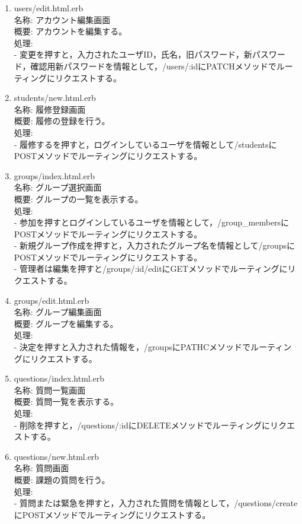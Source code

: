 \begin{enumerate}
\item users/edit.html.erb\\
名称:
アカウント編集画面\\
概要:
アカウントを編集する。\\
処理:\\
- 変更を押すと，入力されたユーザID，氏名，旧パスワード，新パスワード，確認用新パスワードを情報として，/users/:idにPATCHメソッドでルーティングにリクエストする。

\item students/new.html.erb\\
名称:
履修登録画面\\
概要:
履修の登録を行う。\\
処理:\\
- 履修するを押すと，ログインしているユーザを情報として/studentsにPOSTメソッドでルーティングにリクエストする。

\item groups/index.html.erb\\
名称:
グループ選択画面\\
概要:
グループの一覧を表示する。\\
処理:\\
- 参加を押すとログインしているユーザを情報として，/group\_membersにPOSTメソッドでルーティングにリクエストする。\\
- 新規グループ作成を押すと，入力されたグループ名を情報として/groupsにPOSTメソッドでルーティングにリクエストする。\\
- 管理者は編集を押すと/groups/:id/editにGETメソッドでルーティングにリクエストする。

\item groups/edit.html.erb\\
名称:
グループ編集画面\\
概要:
グループを編集する。\\
処理:\\
- 決定を押すと入力された情報を，/groupsにPATHCメソッドでルーティングにリクエストする。

\item questions/index.html.erb\\
名称:
質問一覧画面\\
概要:
質問一覧を表示する。\\
処理:\\
- 削除を押すと，/questions/:idにDELETEメソッドでルーティングにリクエストする。

\item questions/new.html.erb\\
名称:
質問画面\\
概要:
課題の質問を行う。\\
処理:\\
- 質問または緊急を押すと，入力された質問を情報として，/questions/createにPOSTメソッドでルーティングにリクエストする。



\end{enumerate}
